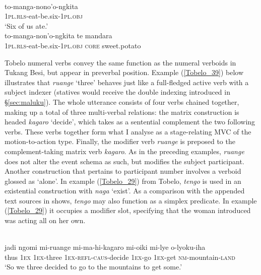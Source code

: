 \ea \label{Tukang_37}
\\
\ea
\gll to-manga-nono'o-ngkita \\
1\textsc{pl}.\textsc{rls}-eat-be.six-1\textsc{pl}.\textsc{obj} \\
\glft `Six of us ate.' \\ 
\ex
\gll *to-manga-non'o-ngkita te mandara \\ 
1\textsc{pl}.\textsc{rls}-eat-be.six-1\textsc{pl}.\textsc{obj} \textsc{core} sweet.potato \\
\z
\z

Tobelo numeral verbs convey the same function as the numeral verboids in Tukang Besi, but appear in preverbal position. Example (\ref{Tobelo_39}) below illustrates that \textit{ruange} `three' behaves just like a full-fledged active verb with a subject indexer (statives would receive the double indexing introduced in §\ref{sec:maluku}). The whole utterance consists of four verbs chained together, making up a total of three multi-verbal relations: the matrix construction is headed \textit{kagaro} `decide', which takes as a sentential complement the two following verbs. These verbs together form what I analyse as a stage-relating MVC of the motion-to-action type. Finally, the modifier verb \textit{ruange} is preposed to the complement-taking matrix verb \textit{kagaro}. As in the preceding examples, \textit{ruange} does not alter the event schema as such, but modifies the subject participant. Another construction that pertains to participant number involves a verboid glossed as `alone'. In example (\ref{Tobelo_29}) from Tobelo, \textit{tengo} is used in an existential construction with \textit{naga} `exist'. As a comparison with the appended text sources in \citet{holton2003tobelo} shows, \textit{tengo} may also function as a simplex predicate. In example (\ref{Tobelo_29}) it occupies a modifier slot, specifying that the woman introduced was acting all on her own. 

\ea \label{Tobelo_39}
\\
\gll jadi  ngomi mi-ruange mi-ma-hi-kagaro mi-oiki mi-lye o-lyoku-iha \\
thus 1\textsc{ex} 1\textsc{ex}-three 1\textsc{ex}-\textsc{refl}-\textsc{caus}-decide 1\textsc{ex}-go 1\textsc{ex}-get \textsc{nm}-mountain-\textsc{land} \\
\glft `So we three decided to go to the mountains to get some.'\\ 
\z

